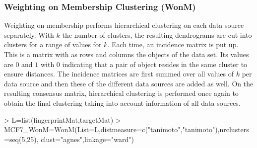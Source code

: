 \documentclass[a4paper]{article}
\begin{document}
\subsubsection{Weighting on Membership Clustering (WonM)}
Weighting on membership performs hierarchical clustering on each data source
separately. With $k$ the number of clusters, the resulting dendrograms
are cut into clusters for a range of values for $k$. Each time, an incidence
matrix is put up. This is a matrix with as rows and columns the objects of the
data set. Its values are $0$ and $1$ with $0$ indicating that a pair of object
resides in the same cluster to ensure distances. The incidence matrices are
first summed over all values of $k$ per data source and then these of the
different data sources are added as well. On the resulting consensus matrix,
hierarchical clustering is performed once again to obtain the final clustering
taking into account information of all data sources.
\begin{Schunk}
\begin{Sinput}
> L=list(fingerprintMat,targetMat)
> MCF7_WonM=WonM(List=L,distmeasure=c("tanimoto","tanimoto"),nrclusters=seq(5,25),
                clust="agnes",linkage="ward")
\end{Sinput}
\end{Schunk}
\end{document}

